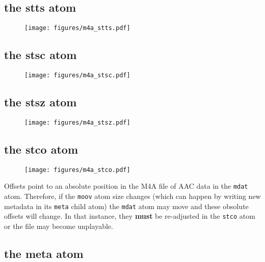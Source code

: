 \subsection{the stts atom}

\begin{figure}[h]
\texttt{[image: figures/m4a\_stts.pdf]}
\end{figure}

\subsection{the stsc atom}

\begin{figure}[h]
\texttt{[image: figures/m4a\_stsc.pdf]}
\end{figure}

\subsection{the stsz atom}

\begin{figure}[h]
\texttt{[image: figures/m4a\_stsz.pdf]}
\end{figure}

\pagebreak

\subsection{the stco atom}

\begin{figure}[h]
\texttt{[image: figures/m4a\_stco.pdf]}
\end{figure}
\par
\noindent
Offsets point to an absolute position in the M4A file of AAC data in
the \texttt{mdat} atom.  Therefore, if the \texttt{moov} atom size changes
(which can happen by writing new metadata in its \texttt{meta} child atom)
the \texttt{mdat} atom may move and these obsolute offsets will change.
In that instance, they \textbf{must}
be re-adjusted in the \texttt{stco} atom or the file may become unplayable.

\subsection{the meta atom}

